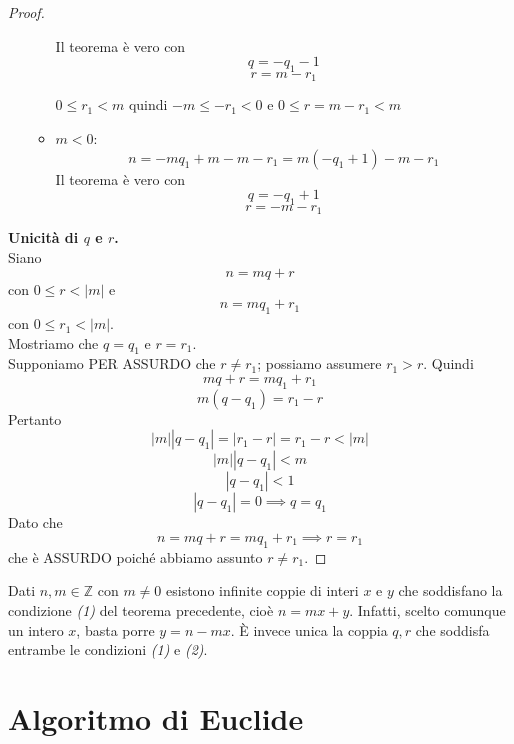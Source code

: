 \documentclass[a4paper,12pt, oneside]{book}
\begin{document}
\begin{proof}
\begin{enumerate}
\begin{itemize}
			            Il teorema è vero con $$q = -q_1-1$$ $$r=m-r_1$$
			            \begin{nota}
				            $0 \leq r_1 < m$ quindi $-m \leq -r_1 < 0$ e $0 \leq r = m-r_1 < m$
			            \end{nota}
			      \item $m < 0$:
			            $$n = -mq_1+m-m-r_1 = m(-q_1+1)-m-r_1$$
			            Il teorema è vero con $$q = -q_1+1$$ $$r=-m-r_1$$
		      \end{itemize}
	\end{enumerate}
	\textbf{Unicità di $q$ e $r$.}\\
	Siano $$n = mq+r$$ con $0 \leq r < |m|$ e $$n = mq_1 + r_1$$ con $0 \leq r_1 < |m|$.\\
	Mostriamo che $q=q_1$ e $r=r_1$.\\
	Supponiamo PER ASSURDO che $r \not = r_1$; possiamo assumere $r_1 > r$. Quindi
	$$mq+r=mq_1+r_1$$
	$$m(q-q_1)=r_1-r$$
	Pertanto
	$$|m||q-q_1| = |r_1-r| = r_1-r < |m|$$
	$$|m||q-q_1| < m$$
	$$|q-q_1| < 1$$
	$$|q-q_1| = 0 \implies q=q_1$$
	Dato che
	$$n = mq+r = mq_1+r_1 \implies r=r_1$$ che è ASSURDO poiché abbiamo assunto $r \not = r_1$.
\end{proof}
\begin{osservazione}
	Dati $n, m \in \mathbb{Z}$ con $m \not = 0$ esistono infinite coppie di interi $x$ e $y$ che soddisfano la condizione \textit{(1)} del teorema precedente, cioè $n = mx+y$. Infatti, scelto comunque un intero $x$, basta porre $y=n-mx$. È invece unica la coppia $q, r$ che soddisfa entrambe le condizioni \textit{(1)} e \textit{(2)}.
\end{osservazione}


\chapter{Algoritmo di Euclide}
\end{document}
